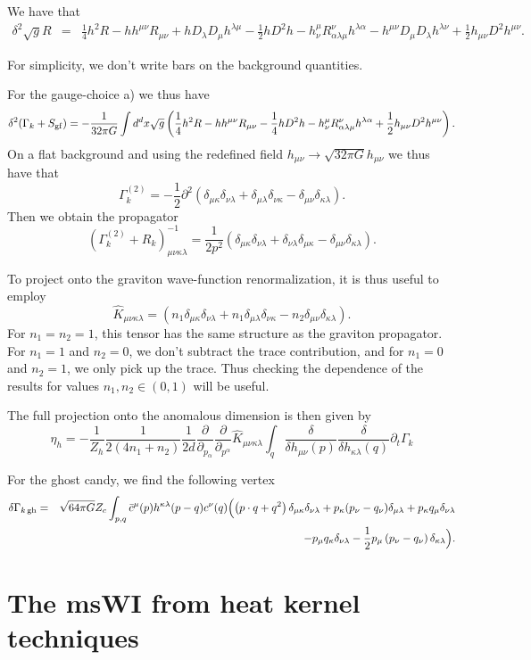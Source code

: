 \documentclass[11pt]{book} %
\newcommand{\be}{\begin{equation}}
\newcommand{\ee}{\end{equation}}
\newcommand{\bea}{\begin{eqnarray}}
\newcommand{\eea}{\end{eqnarray}}
\numberwithin{equation}{chapter}
\begin{document}
\begin{appendices}
We have that
\bea
\delta^2 \sqrt{g}R &=& \frac{1}{4}h^2 R - h h^{\mu \nu}R_{\mu \nu} + hD_{\lambda}D_{\mu}h^{\lambda \mu} - \frac{1}{2}h D^2 h - h^{\mu}_{\nu}R^{\nu}_{\alpha \lambda \mu}h^{\lambda \alpha} - h^{\mu \nu}D_{\mu}D_{\lambda}h^{\lambda\nu}+ \frac{1}{2}h_{\mu \nu}D^2 h^{\mu \nu}.
\eea

For simplicity, we don't write bars on the background quantities.

For the gauge-choice a) we thus have
\be
\delta^2(\Gamma_k+S_{\rm gf})= -\frac{1}{32 \pi G} \int d^dx \sqrt{g}\left(\frac{1}{4}h^2 R - h h^{\mu \nu}R_{\mu \nu} - \frac{1}{4}h D^2 h  - h^{\mu}_{\nu}R^{\nu}_{\alpha \lambda \mu}h^{\lambda \alpha}+ \frac{1}{2}h_{\mu \nu}D^2 h^{\mu \nu}\right).
\ee
On a flat background and using the redefined field $h_{\mu \nu} \rightarrow \sqrt{32 \pi G} h_{\mu \nu}$ we thus have that
\be
\Gamma_k^{(2)} = - \frac{1}{2}\partial^2 \left(\delta_{\mu \kappa}\delta_{\nu \lambda} + \delta_{\mu \lambda} \delta_{\nu \kappa} - \delta_{\mu \nu} \delta_{\kappa \lambda} \right).
\ee
Then we obtain the propagator
\be
(\Gamma_k^{(2)}+R_k)^{-1}_{\mu \nu \kappa \lambda} = \frac{1}{2 p^2}(\delta_{\mu \kappa} \delta_{\nu \lambda}+ \delta_{\nu\lambda}\delta_{\mu\kappa} - \delta_{\mu \nu}\delta_{\kappa \lambda}).
\ee

To project onto the graviton wave-function renormalization, it is thus useful to employ
\be
\hat{K}_{\mu \nu\kappa \lambda}= \left(n_1 \delta_{\mu \kappa}\delta_{\nu \lambda} + n_1 \delta_{\mu \lambda} \delta_{\nu \kappa} -n_2 \delta_{\mu \nu} \delta_{\kappa \lambda} \right).\label{extproj}
\ee
For $n_1=n_2=1$, this tensor has the same structure as the graviton propagator. For $n_1=1$ and $n_2=0$, we don't subtract the trace contribution, and for $n_1=0$ and $n_2=1$, we only pick up the trace. Thus checking the dependence of the results for values $n_1, n_2 \in (0,1)$ will be useful.

The full projection onto the anomalous dimension is then given by
\be
\eta_h = - \frac{1}{Z_h} \frac{1}{2(4n_1+n_2)} \frac{1}{2 d} \frac{\partial}{\partial_{p_{\alpha}}} \frac{\partial}{\partial_{p^{\alpha}}} \hat{K}_{\mu \nu\kappa\lambda} \int_q \frac{\delta}{\delta h_{\mu \nu}(p)}\frac{\delta}{\delta h_{\kappa \lambda}(q)} \partial_t \Gamma_k
\ee

For the ghost candy, we find the following vertex
\bea
\delta \Gamma_{k\, \rm gh}&=& \sqrt{64 \pi G} Z_c \int_{p,q} \bar{c}^{\mu} (p)h^{\kappa \lambda}(p-q)c^{\nu}(q) \Bigl(\left(p\cdot q+q^2\right) \delta_{\mu \kappa} \delta_{\nu\lambda} +p_{\kappa}(p_{\nu}-q_{\nu})\delta_{\mu \lambda} + p_{\kappa}q_{\mu}\delta_{\nu \lambda}\nonumber\\
&{}& - p_{\mu}q_{\kappa}\delta_{\nu \lambda} - \frac{1}{2} p_{\mu}\left(p_{\nu}-q_{\nu}\right)\delta_{\kappa \lambda}\Bigr).
\eea


\chapter{The msWI from heat kernel techniques}
\label{app:msWI}

\end{appendices}
\end{document}
